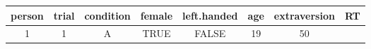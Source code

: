 \documentclass[]{article}
\theoremstyle{definition}
\theoremstyle{definition}
\theoremstyle{definition}
\theoremstyle{remark}
\begin{document}
\begin{longtable}[]{@{}cccccccc@{}}
\toprule
\begin{minipage}[b]{0.09\columnwidth}\centering\strut
person\strut
\end{minipage} & \begin{minipage}[b]{0.08\columnwidth}\centering\strut
trial\strut
\end{minipage} & \begin{minipage}[b]{0.12\columnwidth}\centering\strut
condition\strut
\end{minipage} & \begin{minipage}[b]{0.09\columnwidth}\centering\strut
female\strut
\end{minipage} & \begin{minipage}[b]{0.14\columnwidth}\centering\strut
left.handed\strut
\end{minipage} & \begin{minipage}[b]{0.06\columnwidth}\centering\strut
age\strut
\end{minipage} & \begin{minipage}[b]{0.15\columnwidth}\centering\strut
extraversion\strut
\end{minipage} & \begin{minipage}[b]{0.07\columnwidth}\centering\strut
RT\strut
\end{minipage}\tabularnewline
\midrule
\endhead
\begin{minipage}[t]{0.09\columnwidth}\centering\strut
1\strut
\end{minipage} & \begin{minipage}[t]{0.08\columnwidth}\centering\strut
1\strut
\end{minipage} & \begin{minipage}[t]{0.12\columnwidth}\centering\strut
A\strut
\end{minipage} & \begin{minipage}[t]{0.09\columnwidth}\centering\strut
TRUE\strut
\end{minipage} & \begin{minipage}[t]{0.14\columnwidth}\centering\strut
FALSE\strut
\end{minipage} & \begin{minipage}[t]{0.06\columnwidth}\centering\strut
19\strut
\end{minipage} & \begin{minipage}[t]{0.15\columnwidth}\centering\strut
50\strut
\end{minipage} & \begin{minipage}[t]{0.07\columnwidth}\centering\strut

\end{minipage}
\end{longtable}
\end{document}
